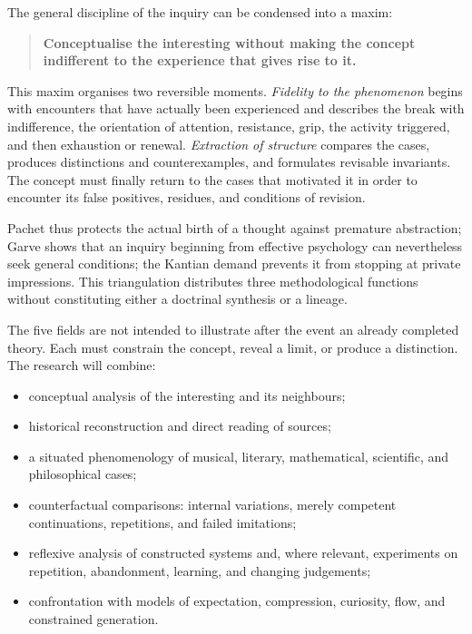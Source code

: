\documentclass[11pt,a4paper]{article}
\begin{document}
The general discipline of the inquiry can be condensed into a maxim:

\begin{quote}
\textbf{Conceptualise the interesting without making the concept indifferent to
the experience that gives rise to it.}
\end{quote}

This maxim organises two reversible moments. \emph{Fidelity to the phenomenon}
begins with encounters that have actually been experienced and describes the
break with indifference, the orientation of attention, resistance, grip, the
activity triggered, and then exhaustion or renewal. \emph{Extraction of
structure} compares the cases, produces distinctions and counterexamples, and
formulates revisable invariants. The concept must finally return to the cases
that motivated it in order to encounter its false positives, residues, and
conditions of revision.

Pachet thus protects the actual birth of a thought against premature
abstraction; Garve shows that an inquiry beginning from effective psychology can
nevertheless seek general conditions; the Kantian demand prevents it from
stopping at private impressions. This triangulation distributes three
methodological functions without constituting either a doctrinal synthesis or a
lineage.

The five fields are not intended to illustrate after the event an already
completed theory. Each must constrain the concept, reveal a limit, or produce a
distinction. The research will combine:

\begin{itemize}
  \item conceptual analysis of the interesting and its neighbours;
  \item historical reconstruction and direct reading of sources;
  \item a situated phenomenology of musical, literary, mathematical,
        scientific, and philosophical cases;
  \item counterfactual comparisons: internal variations, merely competent
        continuations, repetitions, and failed imitations;
  \item reflexive analysis of constructed systems and, where relevant,
        experiments on repetition, abandonment, learning, and changing
        judgements;
  \item confrontation with models of expectation, compression, curiosity,
        flow, and constrained generation.
\end{itemize}
\end{document}
